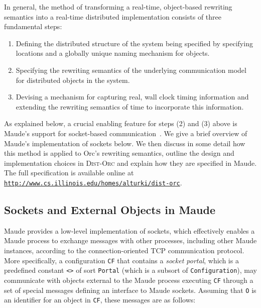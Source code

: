 \documentclass{eptcs}
\begin{document}
In general, the method of transforming a real-time, object-based rewriting semantics into a real-time distributed implementation consists of three fundamental steps:
\begin{enumerate}
\item Defining the distributed structure of the system being specified by specifying locations and a globally unique naming mechanism for objects.
\item Specifying the rewriting semantics of the underlying communication model for distributed objects in the system.
\item Devising a mechanism for capturing real, wall clock timing information and extending the rewriting semantics of time to incorporate this information.
\end{enumerate}
As explained below, a crucial enabling feature for steps (2) and (3) above is Maude's support for socket-based communication~\cite{maude-book}. We give a brief overview of Maude's implementation of sockets below. We then discuss in some detail how this method is applied to Orc's rewriting semantics, outline the design and implementation choices in \textsc{Dist-Orc} and explain how they are specified in Maude. The full specification is available online at \texttt{\url{http://www.cs.illinois.edu/homes/alturki/dist-orc}}.


\subsection{Sockets and External Objects in Maude}

Maude provides a low-level implementation of sockets, which effectively enables a Maude process to exchange messages with other processes, including other Maude instances, according to the connection-oriented TCP communication protocol. More specifically, a configuration \texttt{CF} that contains a \emph{socket portal}, which is a predefined constant \texttt{<>} of sort \texttt{Portal} (which is a subsort of \texttt{Configuration}), may communicate with objects external to the Maude process executing \texttt{CF} through a set of special messages defining an interface to Maude sockets. Assuming that \texttt{O} is an identifier for an object in \texttt{CF}, these messages are as follows:
\end{document}
